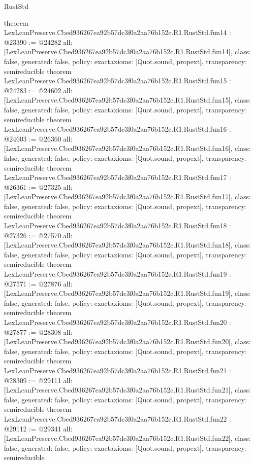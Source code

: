 \begin{lexlean}{RustStd}
\begin{coremodule}
{}
theorem LexLeanPreserve.Cbed936267ea92b57dc3f0a2aa76b152c.R1.RustStd.fun14 : @23390 := @24282 {
  all: [LexLeanPreserve.Cbed936267ea92b57dc3f0a2aa76b152c.R1.RustStd.fun14],
  class: false,
  generated: false,
  policy: exact{axioms: [Quot.sound, propext]},
  transparency: semireducible
}
theorem LexLeanPreserve.Cbed936267ea92b57dc3f0a2aa76b152c.R1.RustStd.fun15 : @24283 := @24602 {
  all: [LexLeanPreserve.Cbed936267ea92b57dc3f0a2aa76b152c.R1.RustStd.fun15],
  class: false,
  generated: false,
  policy: exact{axioms: [Quot.sound, propext]},
  transparency: semireducible
}
theorem LexLeanPreserve.Cbed936267ea92b57dc3f0a2aa76b152c.R1.RustStd.fun16 : @24603 := @26360 {
  all: [LexLeanPreserve.Cbed936267ea92b57dc3f0a2aa76b152c.R1.RustStd.fun16],
  class: false,
  generated: false,
  policy: exact{axioms: [Quot.sound, propext]},
  transparency: semireducible
}
theorem LexLeanPreserve.Cbed936267ea92b57dc3f0a2aa76b152c.R1.RustStd.fun17 : @26361 := @27325 {
  all: [LexLeanPreserve.Cbed936267ea92b57dc3f0a2aa76b152c.R1.RustStd.fun17],
  class: false,
  generated: false,
  policy: exact{axioms: [Quot.sound, propext]},
  transparency: semireducible
}
theorem LexLeanPreserve.Cbed936267ea92b57dc3f0a2aa76b152c.R1.RustStd.fun18 : @27326 := @27570 {
  all: [LexLeanPreserve.Cbed936267ea92b57dc3f0a2aa76b152c.R1.RustStd.fun18],
  class: false,
  generated: false,
  policy: exact{axioms: [Quot.sound, propext]},
  transparency: semireducible
}
theorem LexLeanPreserve.Cbed936267ea92b57dc3f0a2aa76b152c.R1.RustStd.fun19 : @27571 := @27876 {
  all: [LexLeanPreserve.Cbed936267ea92b57dc3f0a2aa76b152c.R1.RustStd.fun19],
  class: false,
  generated: false,
  policy: exact{axioms: [Quot.sound, propext]},
  transparency: semireducible
}
theorem LexLeanPreserve.Cbed936267ea92b57dc3f0a2aa76b152c.R1.RustStd.fun20 : @27877 := @28308 {
  all: [LexLeanPreserve.Cbed936267ea92b57dc3f0a2aa76b152c.R1.RustStd.fun20],
  class: false,
  generated: false,
  policy: exact{axioms: [Quot.sound, propext]},
  transparency: semireducible
}
theorem LexLeanPreserve.Cbed936267ea92b57dc3f0a2aa76b152c.R1.RustStd.fun21 : @28309 := @29111 {
  all: [LexLeanPreserve.Cbed936267ea92b57dc3f0a2aa76b152c.R1.RustStd.fun21],
  class: false,
  generated: false,
  policy: exact{axioms: [Quot.sound, propext]},
  transparency: semireducible
}
theorem LexLeanPreserve.Cbed936267ea92b57dc3f0a2aa76b152c.R1.RustStd.fun22 : @29112 := @29341 {
  all: [LexLeanPreserve.Cbed936267ea92b57dc3f0a2aa76b152c.R1.RustStd.fun22],
  class: false,
  generated: false,
  policy: exact{axioms: [Quot.sound, propext]},
  transparency: semireducible
}
\end{coremodule}
\end{lexlean}
